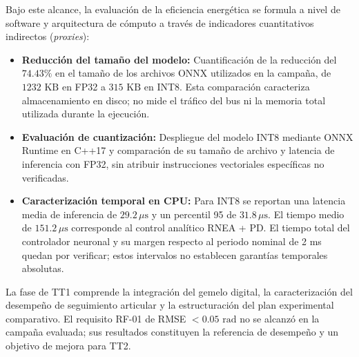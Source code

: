 \documentclass[12pt]{article}
\begin{document}
Bajo este alcance, la evaluación de la eficiencia energética se formula a nivel de software y arquitectura de cómputo a través de indicadores cuantitativos indirectos (\textit{proxies}):
\begin{itemize}
    \item \textbf{Reducción del tamaño del modelo:} Cuantificación de la reducción del $74.43\%$ en el tamaño de los archivos ONNX utilizados en la campaña, de $1232\text{ KB}$ en FP32 a $315\text{ KB}$ en INT8. Esta comparación caracteriza almacenamiento en disco; no mide el tráfico del bus ni la memoria total utilizada durante la ejecución.
    \item \textbf{Evaluación de cuantización:} Despliegue del modelo INT8 mediante ONNX Runtime en C++17 y comparación de su tamaño de archivo y latencia de inferencia con FP32, sin atribuir instrucciones vectoriales específicas no verificadas.
    \item \textbf{Caracterización temporal en CPU:} Para INT8 se reportan una latencia media de inferencia de $29.2\,\mu\text{s}$ y un percentil 95 de $31.8\,\mu\text{s}$. El tiempo medio de $151.2\,\mu\text{s}$ corresponde al control analítico RNEA + PD. El tiempo total del controlador neuronal y su margen respecto al periodo nominal de 2 ms quedan por verificar; estos intervalos no establecen garantías temporales absolutas.
\end{itemize}
La fase de TT1 comprende la integración del gemelo digital, la caracterización del desempeño de seguimiento articular y la estructuración del plan experimental comparativo. El requisito RF-01 de RMSE $<0.05\text{ rad}$ no se alcanzó en la campaña evaluada; sus resultados constituyen la referencia de desempeño y un objetivo de mejora para TT2.
\end{document}
